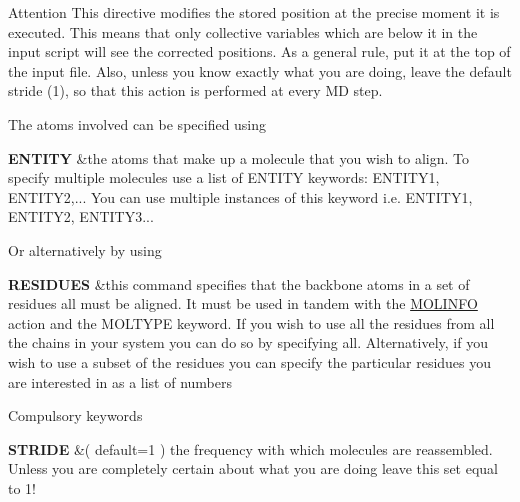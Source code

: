 \begin{DoxyAttention}{Attention}
This directive modifies the stored position at the precise moment it is executed. This means that only collective variables which are below it in the input script will see the corrected positions. As a general rule, put it at the top of the input file. Also, unless you know exactly what you are doing, leave the default stride (1), so that this action is performed at every M\+D step.
\end{DoxyAttention}
\begin{DoxyParagraph}{The atoms involved can be specified using}

\end{DoxyParagraph}
\begin{TabularC}{2}
\hline
{\bfseries  E\+N\+T\+I\+T\+Y } &the atoms that make up a molecule that you wish to align. To specify multiple molecules use a list of E\+N\+T\+I\+T\+Y keywords\+: E\+N\+T\+I\+T\+Y1, E\+N\+T\+I\+T\+Y2,... You can use multiple instances of this keyword i.\+e. E\+N\+T\+I\+T\+Y1, E\+N\+T\+I\+T\+Y2, E\+N\+T\+I\+T\+Y3...   \\
\end{TabularC}


\begin{DoxyParagraph}{Or alternatively by using}

\end{DoxyParagraph}
\begin{TabularC}{2}
\hline
{\bfseries  R\+E\+S\+I\+D\+U\+E\+S } &this command specifies that the backbone atoms in a set of residues all must be aligned. It must be used in tandem with the \hyperlink{MOLINFO}{M\+O\+L\+I\+N\+F\+O} action and the M\+O\+L\+T\+Y\+P\+E keyword. If you wish to use all the residues from all the chains in your system you can do so by specifying all. Alternatively, if you wish to use a subset of the residues you can specify the particular residues you are interested in as a list of numbers   \\
\end{TabularC}


\begin{DoxyParagraph}{Compulsory keywords}

\end{DoxyParagraph}
\begin{TabularC}{2}
\hline
{\bfseries  S\+T\+R\+I\+D\+E } &( default=1 ) the frequency with which molecules are reassembled. Unless you are completely certain about what you are doing leave this set equal to 1!   \\
\end{TabularC}


